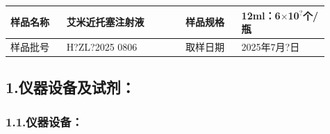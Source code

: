 \documentclass[UTF8,10pt,a4paper,fontset=fandol]{ctexart}
\newcommand{\fieldvalue}[1]{#1}
\newcommand{\handwritten}[1]{#1}
\begin{document}
\begin{tabular}{|p{0.16\linewidth}|p{0.34\linewidth}|p{0.16\linewidth}|p{0.25\linewidth}|}
\hline
样品名称 & 艾米近托塞注射液 & 样品规格 & 12ml：6$\times$10$^{?}$个/瓶 \\
\hline
样品批号 &
\fieldvalue{\handwritten{H?ZL?2025 0806}} &
取样日期 &
\fieldvalue{\handwritten{2025年7月?日}} \\
\hline
\end{tabular}

\subsection*{1.\quad 仪器设备及试剂：}

\subsubsection*{1.1.\quad 仪器设备：}
\end{document}
